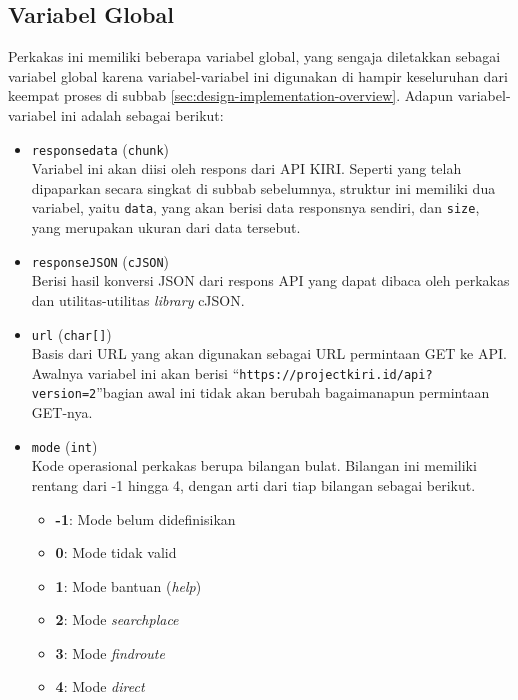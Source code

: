 \subsection{Variabel Global}
\label{sec:design-implementation-globalvars}

Perkakas ini memiliki beberapa variabel global, yang sengaja diletakkan sebagai variabel global karena variabel-variabel ini digunakan di hampir keseluruhan dari keempat proses di subbab \ref{sec:design-implementation-overview}. Adapun variabel-variabel ini adalah sebagai berikut:

\begin{itemize}
	\item \verb|responsedata| (\verb|chunk|) \\
	Variabel ini akan diisi oleh respons dari API KIRI. Seperti yang telah dipaparkan secara singkat di subbab sebelumnya, struktur ini memiliki dua variabel, yaitu \verb|data|, yang akan berisi data responsnya sendiri, dan \verb|size|, yang merupakan ukuran dari data tersebut.
	\item \verb|responseJSON| (\verb|cJSON|) \\
	Berisi hasil konversi JSON dari respons API yang dapat dibaca oleh perkakas dan utilitas-utilitas \textit{library} cJSON.
	\item \verb|url| (\verb|char[]|) \\
	Basis dari URL yang akan digunakan sebagai URL permintaan GET ke API. Awalnya variabel ini akan berisi ``\verb|https://projectkiri.id/api?version=2|''\textemdash bagian awal ini tidak akan berubah bagaimanapun permintaan GET-nya.
	\item \verb|mode| (\verb|int|) \\
	Kode operasional perkakas berupa bilangan bulat. Bilangan ini memiliki rentang dari -1 hingga 4, dengan arti dari tiap bilangan sebagai berikut.
	
	\begin{itemize}
		\item \textbf{-1}: Mode belum didefinisikan
		\item \textbf{0}: Mode tidak valid
		\item \textbf{1}: Mode bantuan (\textit{help})
		\item \textbf{2}: Mode \textit{searchplace}
		\item \textbf{3}: Mode \textit{findroute}
		\item \textbf{4}: Mode \textit{direct}
	\end{itemize}
	

\end{itemize}
